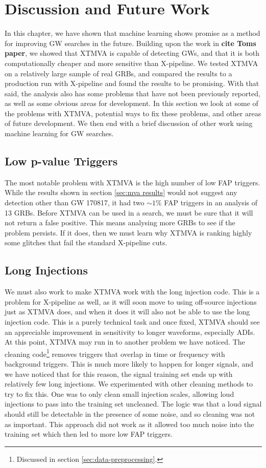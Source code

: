 \documentclass[11pt]{cuthesis}
\newcommand{\xp}{X-pipeline }
\begin{document}
\section{Discussion and Future Work} \label{sec:mva future}
In this chapter, we have shown that machine learning shows promise as a method for improving GW searches in the future. Building upon the work in \textbf{cite Toms paper}, we showed that XTMVA is capable of detecting GWs, and that it is both computationally cheaper and more sensitive than X-pipeline. We tested XTMVA on a relatively large sample of real GRBs, and compared the results to a production run with \xp and found the results to be promising. With that said, the analysis also has some problems that have not been previously reported, as well as some obvious areas for development. In this section we look at some of the problems with XTMVA, potential ways to fix these problems, and other areas of future development. We then end with a brief discussion of other work using machine learning for GW searches.

\subsection{Low p-value Triggers}
The most notable problem with XTMVA is the high number of low FAP triggers. While the results shown in section \ref{sec:mva results} would not suggest any detection other than GW 170817, it had two $\sim1\%$ FAP triggers in an analysis of 13 GRBs. Before XTMVA can be used in a search, we must be sure that it will not return a false positive. This means analysing more GRBs to see if the problem persists. If it does, then we must learn why XTMVA is ranking highly some glitches that fail the standard \xp cuts.

\subsection{Long Injections}
We must also work to make XTMVA work with the long injection code. This is a problem for \xp as well, as it will soon move to using off-source injections just as XTMVA does, and when it does it will also not be able to use the long injection code. This is a purely technical task and once fixed, XTMVA should see an appreciable improvement in sensitivity to longer waveforms, especially ADIs. At this point, XTMVA may run in to another problem we have noticed. The cleaning code\footnote{Discussed in section \ref{sec:data-preprocessing}.} removes triggers that overlap in time or frequency with background triggers. This is much more likely to happen for longer signals, and we have noticed that for this reason, the signal training set ends up with relatively few long injections. We experimented with other cleaning methods to try to fix this. One was to only clean small injection scales, allowing loud injections to pass into the training set uncleaned. The logic was that a loud signal should still be detectable in the presence of some noise, and so cleaning was not as important. This approach did not work as it allowed too much noise into the training set which then led to more low FAP triggers. 
\end{document}
